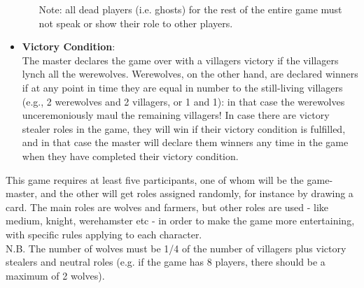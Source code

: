 \begin{itemize}
\begin{itemize}
        Note: all dead players (i.e. ghosts) for the rest of the entire game must not speak or show their role to other players.\\
    \end{itemize}
    \item \textbf{Victory Condition}: \\The master declares the game over with a villagers victory if the villagers lynch all the werewolves. Werewolves, on the other hand, are declared winners if at any point in time they are equal in number to the still-living villagers (e.g., 2 werewolves and 2 villagers, or 1 and 1): in that case the werewolves unceremoniously maul the remaining villagers! In case there are victory stealer roles in the game, they will win if their victory condition is fulfilled, and in that case the master will declare them winners any time in the game when they have completed their victory condition.
\end{itemize}


This game requires at least five participants, one of whom will be the game-master, and the other  will get roles assigned randomly, for instance by drawing a card. The main roles are wolves and farmers, but other roles are used - like medium, knight, werehamster etc - in order to make the game more entertaining, with specific rules applying to each character.\\
N.B. The number of wolves must be 1/4 of the number of villagers plus victory stealers and neutral roles (e.g. if the game has 8 players, there should be a maximum of 2 wolves). \\

